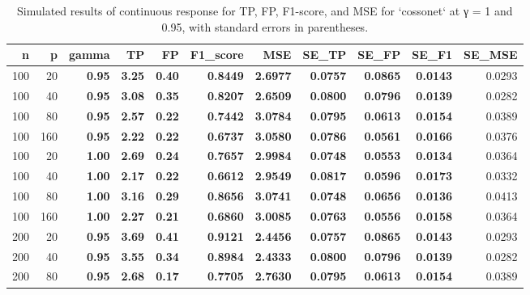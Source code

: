 \begin{table}
\centering
\caption{\label{tab:simulate-table}Simulated results of continuous response for TP, FP, F1-score, and MSE for `cossonet` at γ = 1 and 0.95, with standard errors in parentheses.}
\centering
\begin{tabular}[t]{r|r|>{}r|>{}r|>{}r|>{}r|>{}r|>{}r|>{}r|>{}r|r}
\hline
n & p & gamma & TP & FP & F1\_score & MSE & SE\_TP & SE\_FP & SE\_F1 & SE\_MSE\\
\hline
100 & 20 & \textbf{0.95} & \textbf{3.25} & \textbf{0.40} & \textbf{0.8449} & \textbf{2.6977} & \textbf{0.0757} & \textbf{0.0865} & \textbf{0.0143} & 0.0293\\
\hline
100 & 40 & \textbf{0.95} & \textbf{3.08} & \textbf{0.35} & \textbf{0.8207} & \textbf{2.6509} & \textbf{0.0800} & \textbf{0.0796} & \textbf{0.0139} & 0.0282\\
\hline
100 & 80 & \textbf{0.95} & \textbf{2.57} & \textbf{0.22} & \textbf{0.7442} & \textbf{3.0784} & \textbf{0.0795} & \textbf{0.0613} & \textbf{0.0154} & 0.0389\\
\hline
100 & 160 & \textbf{0.95} & \textbf{2.22} & \textbf{0.22} & \textbf{0.6737} & \textbf{3.0580} & \textbf{0.0786} & \textbf{0.0561} & \textbf{0.0166} & 0.0376\\
\hline
100 & 20 & \textbf{1.00} & \textbf{2.69} & \textbf{0.24} & \textbf{0.7657} & \textbf{2.9984} & \textbf{0.0748} & \textbf{0.0553} & \textbf{0.0134} & 0.0364\\
\hline
100 & 40 & \textbf{1.00} & \textbf{2.17} & \textbf{0.22} & \textbf{0.6612} & \textbf{2.9549} & \textbf{0.0817} & \textbf{0.0596} & \textbf{0.0173} & 0.0332\\
\hline
100 & 80 & \textbf{1.00} & \textbf{3.16} & \textbf{0.29} & \textbf{0.8656} & \textbf{3.0741} & \textbf{0.0748} & \textbf{0.0656} & \textbf{0.0136} & 0.0413\\
\hline
100 & 160 & \textbf{1.00} & \textbf{2.27} & \textbf{0.21} & \textbf{0.6860} & \textbf{3.0085} & \textbf{0.0763} & \textbf{0.0556} & \textbf{0.0158} & 0.0364\\
\hline
200 & 20 & \textbf{0.95} & \textbf{3.69} & \textbf{0.41} & \textbf{0.9121} & \textbf{2.4456} & \textbf{0.0757} & \textbf{0.0865} & \textbf{0.0143} & 0.0293\\
\hline
200 & 40 & \textbf{0.95} & \textbf{3.55} & \textbf{0.34} & \textbf{0.8984} & \textbf{2.4333} & \textbf{0.0800} & \textbf{0.0796} & \textbf{0.0139} & 0.0282\\
\hline
200 & 80 & \textbf{0.95} & \textbf{2.68} & \textbf{0.17} & \textbf{0.7705} & \textbf{2.7630} & \textbf{0.0795} & \textbf{0.0613} & \textbf{0.0154} & 0.0389\\

\end{tabular}
\end{table}
